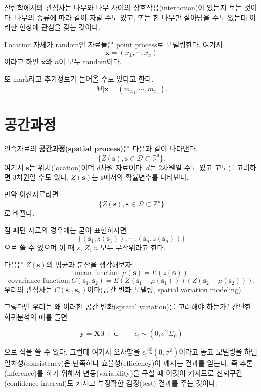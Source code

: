 \documentclass[b5paper,]{book}
\theoremstyle{definition}
\theoremstyle{definition}
\theoremstyle{definition}
\theoremstyle{remark}
\begin{document}
산림학에서의 관심사는 나무와 나무 사이의 상호작용(interaction)이 있는지
보는 것이다. 나무의 종류에 따라 같이 자랄 수도 있고, 또는 한 나무만
살아남을 수도 있는데 이러한 현상에 관심을 갖는 것이다.

Location 자체가 random인 자료들은 point process로 모델링한다. 여기서
\[\mathbf{x}=(x_{1}, \cdots , x_{n})\] 이라고 하면 \(\mathbf{x}\)와
\(n\)이 모두 random이다.

또 mark라고 추가정보가 들어올 수도 있다고 한다.
\[M|\mathbf{x}=(m_{x_{1}}, \cdots , m_{x_{n}}).\]

\chapter{공간과정}\label{spatialprocess}

연속자료의 \textbf{공간과정(spatial process)}은 다음과 같이 나타낸다.
\[\{Z (\mathbf{s}), \mathbf{s} \in \mathcal{D} \subset \mathbb{R}^{d} \} .\]
여기서 \(\mathbf{s}\)는 위치(location)이며 \(d\)차원 자료이다. \(d\)는
2차원일 수도 있고 고도를 고려하면 3차원일 수도 있다. \(Z(\mathbf{s})\)는
\(\mathbf{s}\)에서의 확률변수를 나타낸다.

만약 이산자료라면
\[\{Z (\mathbf{s}), \mathbf{s} \in \mathcal{D} \subset \mathbb{Z}^{d} \} \]
로 바뀐다.

점 패턴 자료의 경우에는 굳이 표현하자면
\[\{ (\mathbf{s}_{1},z(\mathbf{s}_{1})), \cdots , (\mathbf{s}_{n},z(\mathbf{s}_{n}))  \} \]
으로 쓸 수 있으며 이 때 \(s\), \(Z\), \(n\) 모두 무작위라고 한다.

다음은 \(Z(\mathbf{s})\)의 평균과 분산을 생각해보자.
\[\text{mean function}:\mu(\mathbf{s})=E(z(\mathbf{s}))\]
\[\text{covariance function}: C(\mathbf{s}_{1},\mathbf{s}_{2})=E(Z(\mathbf{s}_{1}-\mu(\mathbf{s}_{1})))(Z(\mathbf{s}_{2}-\mu(\mathbf{s}_{2}))).\]
우리의 관심사는 \(C(\mathbf{s}_{1},\mathbf{s}_{2})\)이다(공간 변화
모델링, spatial variation modeling).

그렇다면 우리는 왜 이러한 공간 변화(sptaial variation)를 고려해야
하는가? 간단한 회귀분석의 예를 들면

\begin{equation}
\mathbf{y}=\mathbf{X}\boldsymbol{\beta}+\boldsymbol{\epsilon}, \qquad{\epsilon_{i} \sim (0, \sigma^{2}\Sigma_{0})}
\end{equation}

으로 식을 쓸 수 있다. 그런데 여기서 오차항을
\(\epsilon_{i} \stackrel{\text{iid}}{\sim} (0, \sigma^{2})\)이라고 놓고
모델링을 하면 일치성(consistency)은 만족하나 효율성(efficiency)이 깨지는
결과를 얻는다. 즉 추론(inference)를 하기 위해서 변동(variability)을 구할
때 이것이 커지므로 신뢰구간(confidence interval)도 커지고 부정확한
검정(test) 결과를 주는 것이다.
\end{document}
